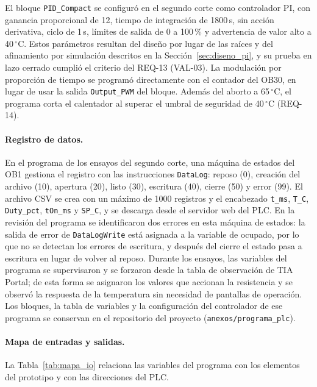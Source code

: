 El bloque \texttt{PID\_Compact} se configuró en el segundo corte como controlador PI, con ganancia proporcional de 12, tiempo de integración de 1800\,s, sin acción derivativa, ciclo de 1\,s, límites de salida de 0 a 100\,\% y advertencia de valor alto a 40\,$^{\circ}$C. Estos parámetros resultan del diseño por lugar de las raíces y del afinamiento por simulación descritos en la Sección~\ref{sec:diseno_pi}, y su prueba en lazo cerrado cumplió el criterio del REQ-13 (VAL-03). La modulación por proporción de tiempo se programó directamente con el contador del OB30, en lugar de usar la salida \texttt{Output\_PWM} del bloque. Además del aborto a 65\,$^{\circ}$C, el programa corta el calentador al superar el umbral de seguridad de 40\,$^{\circ}$C (REQ-14).

\paragraph{Registro de datos.} En el programa de los ensayos del segundo corte, una máquina de estados del OB1 gestiona el registro con las instrucciones \texttt{DataLog}: reposo (0), creación del archivo (10), apertura (20), listo (30), escritura (40), cierre (50) y error (99). El archivo CSV se crea con un máximo de 1000 registros y el encabezado \texttt{t\_ms}, \texttt{T\_C}, \texttt{Duty\_pct}, \texttt{tOn\_ms} y \texttt{SP\_C}, y se descarga desde el servidor web del PLC. En la revisión del programa se identificaron dos errores en esta máquina de estados: la salida de error de \texttt{DataLogWrite} está asignada a la variable de ocupado, por lo que no se detectan los errores de escritura, y después del cierre el estado pasa a escritura en lugar de volver al reposo. Durante los ensayos, las variables del programa se supervisaron y se forzaron desde la tabla de observación de TIA Portal; de esta forma se asignaron los valores que accionan la resistencia y se observó la respuesta de la temperatura sin necesidad de pantallas de operación. Los bloques, la tabla de variables y la configuración del controlador de ese programa se conservan en el repositorio del proyecto (\texttt{anexos/programa\_plc}).

\paragraph{Mapa de entradas y salidas.} La Tabla~\ref{tab:mapa_io} relaciona las variables del programa con los elementos del prototipo y con las direcciones del PLC.

